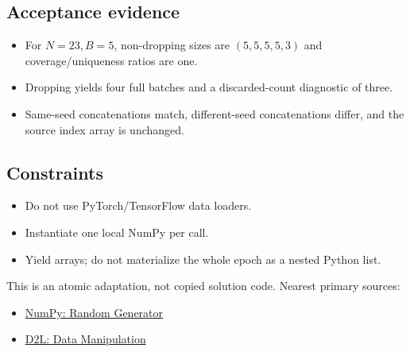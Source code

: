         \subsection{Acceptance evidence}

        \begin{evidencebox}
        \begin{itemize}
          \item For $N=23,B=5$, non-dropping sizes are $(5,5,5,5,3)$ and coverage/uniqueness ratios are one.
  \item Dropping yields four full batches and a discarded-count diagnostic of three.
  \item Same-seed concatenations match, different-seed concatenations differ, and the source index array is unchanged.
        \end{itemize}
        \end{evidencebox}

        \subsection{Constraints}

        \begin{itemize}
          \item Do not use PyTorch/TensorFlow data loaders.
  \item Instantiate one local NumPy  per call.
  \item Yield arrays; do not materialize the whole epoch as a nested Python list.
        \end{itemize}

        \begin{sourcebox}
        This is an atomic adaptation, not copied solution code. Nearest primary sources:
        \begin{itemize}
          \item \href{https://numpy.org/doc/stable/reference/random/generator.html}{NumPy: Random Generator}
  \item \href{https://d2l.ai/chapter_preliminaries/ndarray.html}{D2L: Data Manipulation}
        \end{itemize}
        \end{sourcebox}
